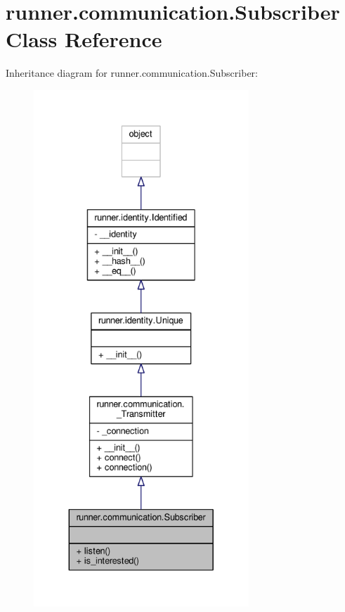 \hypertarget{classrunner_1_1communication_1_1Subscriber}{}\section{runner.\+communication.\+Subscriber Class Reference}
\label{classrunner_1_1communication_1_1Subscriber}


Inheritance diagram for runner.\+communication.\+Subscriber\+:
\nopagebreak
\begin{figure}[H]
\begin{center}
\leavevmode
\includegraphics[height=550pt]{classrunner_1_1communication_1_1Subscriber__inherit__graph}
\end{center}
\end{figure}


